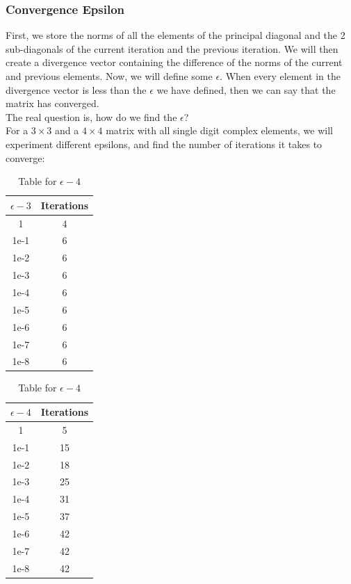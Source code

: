 \documentclass[12pt]{article}
\begin{document}
		\subsubsection{Convergence Epsilon}
		First, we store the norms of all the elements of the principal diagonal and the 2 sub-diagonals of the current iteration and the previous iteration. We will then create a divergence vector containing the difference of the norms of the current and previous elements.
		Now, we will define some $\epsilon$. When every element in the divergence vector is less than the $\epsilon$ we have defined, then we can say that the matrix has converged.\\ 
		The real question is, how do we find the $\epsilon$?\\
		For a $3\times 3$ and a $4 \times 4$ matrix with all single digit complex elements, we will experiment different epsilons, and find the number of iterations it takes to converge:
		\begin{table}[H]
			\centering
			\begin{minipage}{0.45\textwidth}
				\centering
				\begin{tabular}{|c|c|}
					\hline
					$\epsilon - 3$ & Iterations \\
					\hline
					1 & 4 \\
					1e-1 & 6 \\
					1e-2 & 6 \\
					1e-3 & 6 \\
					1e-4 & 6 \\
					1e-5 & 6 \\
					1e-6 & 6 \\
					1e-7 & 6 \\
					1e-8 & 6 \\
					\hline
				\end{tabular}
				\caption{Table for $\epsilon - 3$}
			\end{minipage}%
			\hspace{0.5cm}  %
			\begin{minipage}{0.45\textwidth}
				\centering
				\begin{tabular}{|c|c|}
					\hline
					$\epsilon - 4$ & Iterations \\
					\hline
					1 & 5 \\
					1e-1 & 15 \\
					1e-2 & 18 \\
					1e-3 & 25 \\
					1e-4 & 31 \\
					1e-5 & 37 \\
					1e-6 & 42 \\
					1e-7 & 42 \\
					1e-8 & 42 \\
					\hline
				\end{tabular}
				\caption{Table for $\epsilon - 4$}
			\end{minipage}
		\end{table}
\end{document}

